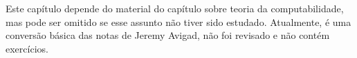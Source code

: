 \documentclass[../../../include/open-logic-chapter]{subfiles}
\begin{document}
\begin{editorial}
  Este capítulo depende do material do capítulo sobre teoria da
  computabilidade, mas pode ser omitido se esse assunto não tiver sido
  estudado. Atualmente, é uma conversão básica das notas de Jeremy
  Avigad, não foi revisado e não contém exercícios.
\end{editorial}












\OLEndChapterHook
\end{document}
